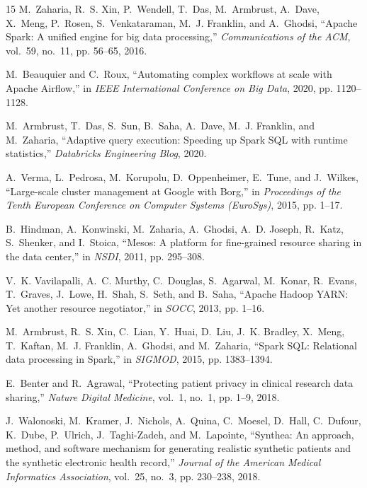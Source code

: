 \documentclass[10pt,journal,compsoc]{IEEEtran}
\begin{document}
\begin{thebibliography}{15}
M.~Zaharia, R.~S. Xin, P.~Wendell, T.~Das, M.~Armbrust, A.~Dave, X.~Meng, P.~Rosen, S.~Venkataraman, M.~J. Franklin, and A.~Ghodsi, ``Apache Spark: A unified engine for big data processing,'' \emph{Communications of the ACM}, vol.~59, no.~11, pp. 56--65, 2016.

M.~Beauquier and C.~Roux, ``Automating complex workflows at scale with Apache Airflow,'' in \emph{IEEE International Conference on Big Data}, 2020, pp. 1120--1128.

M.~Armbrust, T.~Das, S.~Sun, B.~Saha, A.~Dave, M.~J. Franklin, and M.~Zaharia, ``Adaptive query execution: Speeding up Spark SQL with runtime statistics,'' \emph{Databricks Engineering Blog}, 2020.

A.~Verma, L.~Pedrosa, M.~Korupolu, D.~Oppenheimer, E.~Tune, and J.~Wilkes, ``Large-scale cluster management at Google with Borg,'' in \emph{Proceedings of the Tenth European Conference on Computer Systems (EuroSys)}, 2015, pp. 1--17.

B.~Hindman, A.~Konwinski, M.~Zaharia, A.~Ghodsi, A.~D. Joseph, R.~Katz, S.~Shenker, and I.~Stoica, ``Mesos: A platform for fine-grained resource sharing in the data center,'' in \emph{NSDI}, 2011, pp. 295--308.

V.~K. Vavilapalli, A.~C. Murthy, C.~Douglas, S.~Agarwal, M.~Konar, R.~Evans, T.~Graves, J.~Lowe, H.~Shah, S.~Seth, and B.~Saha, ``Apache Hadoop YARN: Yet another resource negotiator,'' in \emph{SOCC}, 2013, pp. 1--16.

M.~Armbrust, R.~S. Xin, C.~Lian, Y.~Huai, D.~Liu, J.~K. Bradley, X.~Meng, T.~Kaftan, M.~J. Franklin, A.~Ghodsi, and M.~Zaharia, ``Spark SQL: Relational data processing in Spark,'' in \emph{SIGMOD}, 2015, pp. 1383--1394.

E.~Benter and R.~Agrawal, ``Protecting patient privacy in clinical research data sharing,'' \emph{Nature Digital Medicine}, vol.~1, no.~1, pp. 1--9, 2018.

J.~Walonoski, M.~Kramer, J.~Nichols, A.~Quina, C.~Moesel, D.~Hall, C.~Dufour, K.~Dube, P.~Ulrich, J.~Taghi-Zadeh, and M.~Lapointe, ``Synthea: An approach, method, and software mechanism for generating realistic synthetic patients and the synthetic electronic health record,'' \emph{Journal of the American Medical Informatics Association}, vol.~25, no.~3, pp. 230--238, 2018.


\end{thebibliography}
\end{document}
